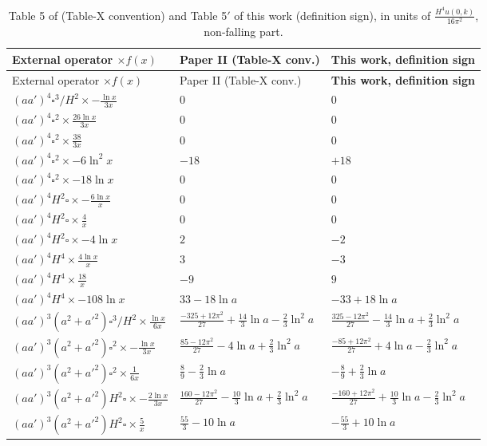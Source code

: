 {\small\renewcommand{\arraystretch}{1.3}
\setlength{\tabcolsep}{3pt}
\begin{longtable}{@{}l l l@{}}
\caption{Table 5 of \PII{} (Table-X convention) and Table 5$'$ of this work (definition sign), in units of $\frac{H^4u(0,k)}{16\pi^2}$, non-falling part.}\label{tab:ch09-t5}\\
\toprule
External operator $\times f(x)$ & Paper II (Table-X conv.) & \textbf{This work, definition sign}\\
\midrule
\endfirsthead
\toprule
External operator $\times f(x)$ & Paper II (Table-X conv.) & \textbf{This work, definition sign}\\
\midrule
\endhead
$(aa')^4\square^3/H^2\times-\frac{\ln x}{3x}$ & $0$ & $0$\\
$(aa')^4\square^2\times\frac{26\ln x}{3x}$ & $0$ & $0$\\
$(aa')^4\square^2\times\frac{38}{3x}$ & $0$ & $0$\\
$(aa')^4\square^2\times-6\ln^2x$ & $-18$ & $+18$\\
$(aa')^4\square^2\times-18\ln x$ & $0$ & $0$\\
$(aa')^4H^2\square\times-\frac{6\ln x}{x}$ & $0$ & $0$\\
$(aa')^4H^2\square\times\frac4x$ & $0$ & $0$\\
$(aa')^4H^2\square\times-4\ln x$ & $2$ & $-2$\\
$(aa')^4H^4\times\frac{4\ln x}{x}$ & $3$ & $-3$\\
$(aa')^4H^4\times\frac{18}x$ & $-9$ & $9$\\
$(aa')^4H^4\times-108\ln x$ & $33-18\ln a$ & $-33+18\ln a$\\
$(aa')^3(a^2{+}a'^2)\square^3/H^2\times\frac{\ln x}{6x}$ & $\frac{-325+12\pi^2}{27}+\frac{14}3\ln a-\frac23\ln^2a$ & $\frac{325-12\pi^2}{27}-\frac{14}3\ln a+\frac23\ln^2a$\\[2pt]
$(aa')^3(a^2{+}a'^2)\square^2\times-\frac{\ln x}{3x}$ & $\frac{85-12\pi^2}{27}-4\ln a+\frac23\ln^2a$ & $\frac{-85+12\pi^2}{27}+4\ln a-\frac23\ln^2a$\\[2pt]
$(aa')^3(a^2{+}a'^2)\square^2\times\frac1{6x}$ & $\frac89-\frac23\ln a$ & $-\frac89+\frac23\ln a$\\[2pt]
$(aa')^3(a^2{+}a'^2)H^2\square\times-\frac{2\ln x}{3x}$ & $\frac{160-12\pi^2}{27}-\frac{10}3\ln a+\frac23\ln^2a$ & $\frac{-160+12\pi^2}{27}+\frac{10}3\ln a-\frac23\ln^2a$\\[2pt]
$(aa')^3(a^2{+}a'^2)H^2\square\times\frac5x$ & $\frac{55}3-10\ln a$ & $-\frac{55}3+10\ln a$\\[2pt]

\end{longtable}}
